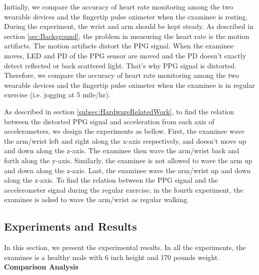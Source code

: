 \documentclass[11pt, draftclsnofoot, onecolumn]{IEEEtran}
\begin{document}
    Initially, we compare the accuracy of heart rate monitoring among the two wearable devices and the fingertip pulse oximeter when the examinee is resting. During the experiment, the wrist and arm should be kept steady. As described in section \ref{sec:Background}, the problem in measuring the heart rate is the motion artifacts. The motion artifacts distort the PPG signal. When the examinee moves, LED and PD of the PPG sensor are moved and the PD doesn’t exactly detect reflected or back scattered light. That’s why PPG signal is distorted. Therefore, we compare the accuracy of heart rate monitoring among the two wearable devices and the fingertip pulse oximeter when the examinee is in regular exercise (i.e. jogging at 5 mile/hr).
    
    As described in section \ref{subsec:HardwareRelatedWork}, to find the relation between the distorted PPG signal and acceleration from each axis of accelerometers, we design the experiments as bellow. First, the examinee wave the arm/wrist left and right along the x-axis respectively, and doesn’t move up and down along the z-axis. The examinee then wave the arm/wrist back and forth along the y-axis. Similarly, the examinee is not allowed to wave the arm up and down along the z-axis. Last, the examinee wave the arm/wrist up and down along the z-axis. To find the relation between the PPG signal and the accelerometer signal during the regular exercise, in the fourth experiment, the examinee is asked to wave the arm/wrist as regular walking.

    

	\subsection{Experiments and Results} %
    
    In this section, we present the experimental results. In all the experiments, the examinee is a healthy male with 6 inch height and 170 pounds weight. 
\\
    
    \textbf{Comparison Analysis}
    
\end{document}

